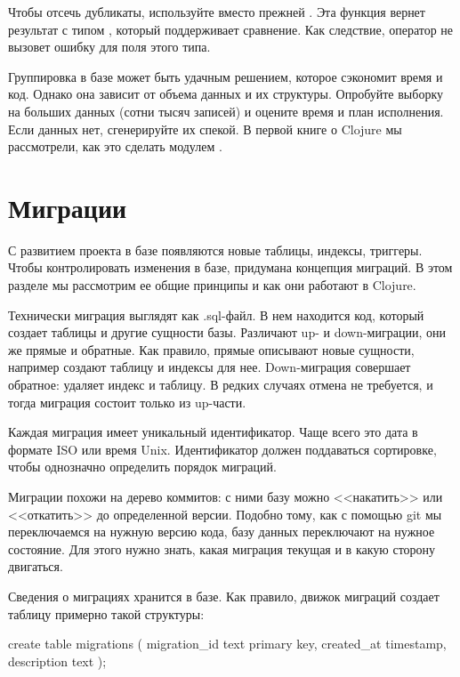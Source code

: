 Чтобы отсечь дубликаты, используйте  вместо прежней . Эта функция вернет результат с типом , который поддерживает сравнение. Как следствие, оператор  не вызовет ошибку для поля этого типа.

Группировка в базе может быть удачным решением, которое сэкономит время и код. Однако она зависит от объема данных и их структуры. Опробуйте выборку на больших данных (сотни тысяч записей) и оцените время и план исполнения. Если данных нет, сгенерируйте их спекой. В первой книге о Clojure мы рассмотрели, как это сделать модулем .

\section{Миграции}

С развитием проекта в базе появляются новые таблицы, индексы, триггеры. Чтобы контролировать изменения в базе, придумана концепция миграций. В этом разделе мы рассмотрим ее общие принципы и как они работают в Clojure.

Технически миграция выглядят как .sql-файл. В нем находится код, который создает таблицы и другие сущности базы. Различают up- и down-миграции, они же прямые и обратные. Как правило, прямые описывают новые сущности, например создают таблицу и индексы для нее. Down-миграция совершает обратное: удаляет индекс и таблицу. В редких случаях отмена не требуется, и тогда миграция состоит только из up-части.

Каждая миграция имеет уникальный идентификатор. Чаще всего это дата в формате ISO или время Unix. Идентификатор должен поддаваться сортировке, чтобы однозначно определить порядок миграций.

Миграции похожи на дерево коммитов: с ними базу можно <<накатить>> или <<откатить>> до определенной версии. Подобно тому, как с помощью git мы переключаемся на нужную версию кода, базу данных переключают на нужное состояние. Для этого нужно знать, какая миграция текущая и в какую сторону двигаться.

Сведения о миграциях хранится в базе. Как правило, движок миграций создает таблицу  примерно такой структуры:

\begin{english}
  \begin{sql}
create table migrations (
  migration_id text primary key,
  created_at timestamp,
  description text
);
  \end{sql}
\end{english}

